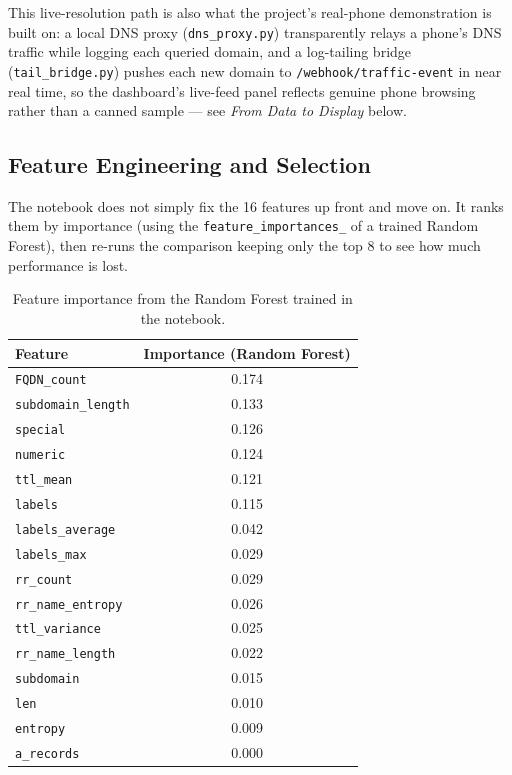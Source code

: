 \documentclass[12pt,a4paper]{report}
\begin{document}
This live-resolution path is also what the project's real-phone demonstration is built on: a local DNS proxy (\texttt{dns\_proxy.py}) transparently relays a phone's DNS traffic while logging each queried domain, and a log-tailing bridge (\texttt{tail\_bridge.py}) pushes each new domain to \texttt{/webhook/traffic-event} in near real time, so the dashboard's live-feed panel reflects genuine phone browsing rather than a canned sample --- see \emph{From Data to Display} below.

\subsection*{Feature Engineering and Selection}
The notebook does not simply fix the 16 features up front and move on. It ranks them by importance (using the \texttt{feature\_importances\_} of a trained Random Forest), then re-runs the comparison keeping only the top 8 to see how much performance is lost.

\begin{table}[h]
\centering
\small
\begin{tabular}{@{}lc@{}}
\toprule
\textbf{Feature} & \textbf{Importance (Random Forest)} \\
\midrule
\texttt{FQDN\_count}        & 0.174 \\
\texttt{subdomain\_length}  & 0.133 \\
\texttt{special}            & 0.126 \\
\texttt{numeric}            & 0.124 \\
\texttt{ttl\_mean}          & 0.121 \\
\texttt{labels}             & 0.115 \\
\texttt{labels\_average}    & 0.042 \\
\texttt{labels\_max}        & 0.029 \\
\texttt{rr\_count}          & 0.029 \\
\texttt{rr\_name\_entropy}  & 0.026 \\
\texttt{ttl\_variance}      & 0.025 \\
\texttt{rr\_name\_length}   & 0.022 \\
\texttt{subdomain}          & 0.015 \\
\texttt{len}                & 0.010 \\
\texttt{entropy}            & 0.009 \\
\texttt{a\_records}         & 0.000 \\
\bottomrule
\end{tabular}
\caption{Feature importance from the Random Forest trained in the notebook.}
\end{table}
\end{document}
